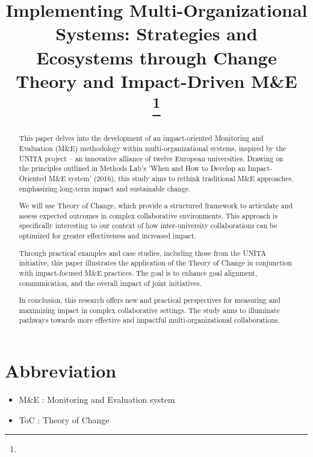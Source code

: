 \documentclass[conference]{IEEEtran}
\begin{document}
\title{Implementing Multi-Organizational Systems: Strategies and Ecosystems through Change Theory and Impact-Driven M\&E\\
{\footnotesize \textsuperscript{}}
\thanks{}
}

\author{
}
\maketitle

\section*{Abbreviation}
\begin{itemize}
    \item[] M\&E : Monitoring and Evaluation system 
    \item[] ToC : Theory of Change 
\end{itemize}

\begin{abstract}
This paper delves into the development of an impact-oriented Monitoring and Evaluation (M\&E) methodology within multi-organizational systems, inspired by the UNITA project – an innovative alliance of twelve European universities. Drawing on the principles outlined in Methods Lab's 'When and How to Develop an Impact-Oriented M\&E system' (2016), this study aims to rethink traditional M\&E approaches, emphasizing long-term impact and sustainable change.

We will use Theory of Change, which provide a structured framework to articulate and assess expected outcomes in complex collaborative environments. This approach is specifically interesting to our context of how inter-university collaborations can be optimized for greater effectiveness and increased impact.

Through practical examples and case studies, including those from the UNITA initiative, this paper illustrates the application of the Theory of Change in conjunction with impact-focused M\&E practices. The goal is to enhance goal alignment, communication, and the overall impact of joint initiatives.

In conclusion, this research offers new and practical perspectives for measuring and maximizing impact in complex collaborative settings. The study aims to illuminate pathways towards more effective and impactful multi-organizational collaborations.
\end{abstract}
\end{document}
